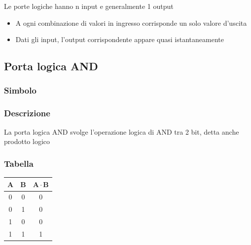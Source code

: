 Le porte logiche hanno n input e generalmente 1 output
\begin{itemize}
    \item A ogni combinazione di valori in ingresso corrisponde un solo valore d'uscita
    \item Dati gli input, l'output corrispondente appare quasi istantaneamente
\end{itemize}

\subsection{Porta logica AND}

\begin{minipage}[t]{0.31\textwidth}
    \subsubsection{Simbolo}
\end{minipage}
\hfill
\begin{minipage}[t]{0.31\textwidth}
    \subsubsection{Descrizione}
    La porta logica AND svolge l'operazione logica di AND tra 2 bit, detta anche prodotto logico
\end{minipage}
\hfill
\begin{minipage}[t]{0.31\textwidth}
        \subsubsection{Tabella}
        \begin{tabular}{|c|c|c|}
            \hline
            $\mathbf{A}$ & $\mathbf{B}$ & $\mathbf{A \cdot B}$ \\ \hline
            0   &   0   &   0 \\ \hline
            0   &   1   &   0 \\ \hline
            1   &   0   &   0 \\ \hline
            1   &   1   &   1 \\ \hline

        \end{tabular}
\end{minipage}


